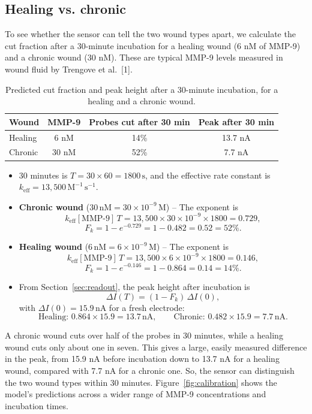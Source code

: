 \documentclass[10pt,a4paper]{article}
\numberwithin{equation}{section}
\newcommand{\cit}[1]{[#1]}
\newcommand{\keff}{k_{\mathrm{eff}}}
\newcommand{\MMP}{[\text{MMP-9}]}
\newcommand{\dropdown}{\par\medskip}
\begin{document}
\subsection{Healing vs. chronic}
To see whether the sensor can tell the two wound types apart, we calculate the cut fraction after a 30-minute incubation for a healing wound (6 nM of MMP-9) and a chronic wound (30 nM). These are typical MMP-9 levels measured in wound fluid by Trengove et al.~\cit{1}.

\begin{table}[H]
\centering
\footnotesize\renewcommand{\arraystretch}{1.25}
\begin{tabular}{@{}lccc@{}}
\toprule
Wound & MMP-9 & Probes cut after 30 min & Peak after 30 min \\
\midrule
Healing & 6 nM & 14\% & 13.7 nA \\
Chronic & 30 nM & 52\% & 7.7 nA \\
\bottomrule
\end{tabular}
\caption{Predicted cut fraction and peak height after a 30-minute incubation, for a healing and a chronic wound.}
\label{tab:healing_chronic}
\end{table}

\dropdown
\begin{itemize}
  \item 30 minutes is $T = 30\times60 = 1800\,\mathrm{s}$, and the effective rate constant is $\keff = 13{,}500\,\mathrm{M^{-1}\,s^{-1}}$.
  \item \textbf{Chronic wound} ($30\,\mathrm{nM} = 30\times10^{-9}\,\mathrm{M}$) -- The exponent is
  \[ \keff\MMP\,T = 13{,}500\times30\times10^{-9}\times1800 = 0.729, \]
  \[ F_k = 1 - e^{-0.729} = 1 - 0.482 = 0.52 = 52\%. \]
  \item \textbf{Healing wound} ($6\,\mathrm{nM} = 6\times10^{-9}\,\mathrm{M}$) -- The exponent is
  \[ \keff\MMP\,T = 13{,}500\times6\times10^{-9}\times1800 = 0.146, \]
  \[ F_k = 1 - e^{-0.146} = 1 - 0.864 = 0.14 = 14\%. \]
  \item From Section~\ref{sec:readout}, the peak height after incubation is
  \[ \Delta I(T) = (1 - F_k)\,\Delta I(0), \]
  with $\Delta I(0) = 15.9\,\mathrm{nA}$ for a fresh electrode:
  \[ \text{Healing: } 0.864\times15.9 = 13.7\,\mathrm{nA}, \qquad \text{Chronic: } 0.482\times15.9 = 7.7\,\mathrm{nA}. \]
\end{itemize}

A chronic wound cuts over half of the probes in 30 minutes, while a healing wound cuts only about one in seven. This gives a large, easily measured difference in the peak, from 15.9 nA before incubation down to 13.7 nA for a healing wound, compared with 7.7 nA for a chronic one. So, the sensor can distinguish the two wound types within 30 minutes. Figure~\ref{fig:calibration} shows the model's predictions across a wider range of MMP-9 concentrations and incubation times.
\end{document}
